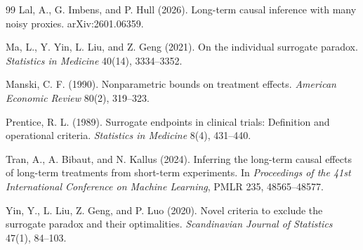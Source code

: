 \documentclass[11pt]{article}
\theoremstyle{definition}
\theoremstyle{plain}
\theoremstyle{remark}
\begin{document}
\begin{thebibliography}{99}
Lal, A., G. Imbens, and P. Hull (2026).
\newblock Long-term causal inference with many noisy proxies.
\newblock arXiv:2601.06359.

Ma, L., Y. Yin, L. Liu, and Z. Geng (2021).
\newblock On the individual surrogate paradox.
\newblock \emph{Statistics in Medicine} 40(14), 3334--3352.

Manski, C. F. (1990).
\newblock Nonparametric bounds on treatment effects.
\newblock \emph{American Economic Review} 80(2), 319--323.

Prentice, R. L. (1989).
\newblock Surrogate endpoints in clinical trials: Definition and operational criteria.
\newblock \emph{Statistics in Medicine} 8(4), 431--440.

Tran, A., A. Bibaut, and N. Kallus (2024).
\newblock Inferring the long-term causal effects of long-term treatments from short-term experiments.
\newblock In \emph{Proceedings of the 41st International Conference on Machine Learning}, PMLR 235, 48565--48577.

Yin, Y., L. Liu, Z. Geng, and P. Luo (2020).
\newblock Novel criteria to exclude the surrogate paradox and their optimalities.
\newblock \emph{Scandinavian Journal of Statistics} 47(1), 84--103.
\end{thebibliography}
\end{document}
